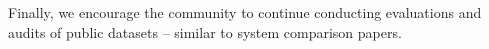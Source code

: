 Finally, we encourage the community to continue conducting evaluations and audits of public datasets -- similar to system comparison papers.

